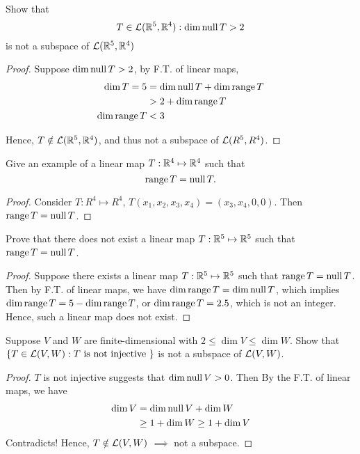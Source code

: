 \begin{exercise}
Show that \[
	{T \in \mathcal{L}(\mathbb{R}^5, \mathbb{R}^4) : \dim \mathop{\mathrm{null}} T > 2}\]
is not a subspace of \(\mathcal{L} (\mathbb{R}^5,\mathbb{R}^4)\)
\end{exercise}

\begin{proof}
	Suppose \(\dim \mathop{\mathrm{null}} T > 2\), by F.T. of linear maps,
	\begin{align*}
		\dim T = 5    & = \dim \mathop{\mathrm{null}} T + \dim \mathop{\mathrm{range}} T \\
		              & > 2 + \dim \mathop{\mathrm{range}} T            \\
		\dim \mathop{\mathrm{range}} T & < 3
	\end{align*}

	Hence, $T \notin \mathcal{L}(\mathbb{R}^5, \mathbb{R}^4)$, and thus not a subspace of \(\mathcal{L} (R^5, R^4)\).
\end{proof}

\begin{exercise}
Give an example of a linear map \(T : \mathbb{R}^4 \mapsto \mathbb{R}^4\) such that \[
	\mathop{\mathrm{range}} T = \mathop{\mathrm{null}} T.\]
\end{exercise}

\begin{proof}
	Consider \(T : R^4 \mapsto R^4\), \(T(x_1, x_2, x_3, x_4) = (x_3, x_4, 0, 0)\). Then \(\mathop{\mathrm{range}} T = \mathop{\mathrm{null}} T\).
\end{proof}

\begin{exercise}
Prove that there does not exist a linear map \(T : \mathbb{R}^5 \mapsto \mathbb{R}^5 \) such that \(\mathop{\mathrm{range}} T = \mathop{\mathrm{null}} T\).
\end{exercise}

\begin{proof}
	Suppose there exists a linear map \(T: \mathbb{R}^5 \mapsto \mathbb{R}^5\) such that \(\mathop{\mathrm{range}} T = \mathop{\mathrm{null}} T\). Then by F.T. of linear maps, we have \(\dim \mathop{\mathrm{range}} T = \dim \mathop{\mathrm{null}} T\), which implies \(\dim \mathop{\mathrm{range}} T = 5 - \dim \mathop{\mathrm{range}} T\), or \(\dim \mathop{\mathrm{range}} T = 2.5\), which is not an integer. Hence, such a linear map does not exist.
\end{proof}

\begin{exercise}
Suppose $V$ and $W$ are finite-dimensional with \(2 \leq \dim V \leq \dim W.\) Show that \(\{T \in \mathcal{L}(V,W) : T \text{ is not injective }\}\)  is not a subspace of \(\mathcal{L}(V,W)\).
\end{exercise}

\begin{proof}
	$T$ is not injective suggests that \(\dim \mathop{\mathrm{null}} V >0\).
	Then By the F.T. of linear maps, we have
	\begin{align*}
		\dim V & = \dim \mathop{\mathrm{null}} V + \dim W         \\
		       & \geq 1 + \dim W \geq 1 + \dim V
	\end{align*}
	Contradicts! Hence, \(T \notin \mathcal{L}(V,W)\) $\implies$ not a subspace.
\end{proof}

